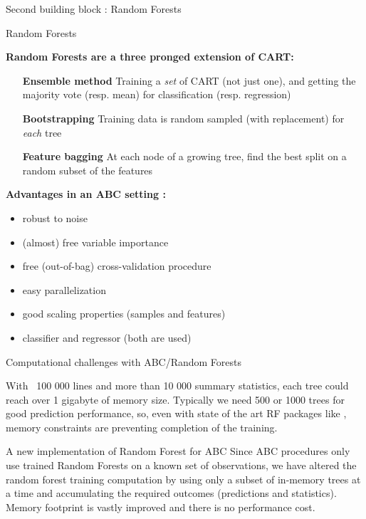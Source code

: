 \documentclass[final]{beamer}
\newlength{\colwidth}
\begin{document}
\begin{frame}[t]
\begin{columns}[t]
\begin{column}{\colwidth}
\begin{block}{Second building block : Random Forests}
\begin{block}{Random Forests}
      \begin{multicols}{2}
        \textbf{Random Forests \cite{breiman:2001} are a three pronged extension of CART:}
        \begin{itemize}
          \item[\textbf{Ensemble method}] Training a \emph{set} of CART (not just one), and getting the majority vote (resp. mean) for classification (resp. regression)
          \item[\textbf{Bootstrapping}] Training data is random sampled (with replacement) for \emph{each} tree
          \item[\textbf{Feature bagging}] At each node of a growing tree, find the best split on a random subset of the features 
        \end{itemize}
        \columnbreak
         \centering
        \textbf{Advantages in an ABC setting : }
        \justify
        \begin{itemize}
          \item robust to noise
          \item (almost) free variable importance
          \item free (out-of-bag) cross-validation procedure
          \item easy parallelization
          \item good scaling properties (samples and features)
          \item classifier and regressor (both are used)
        \end{itemize}  
          
      \end{multicols}


    \end{block}
  \end{block}

  \begin{alertblock}{Computational challenges with ABC/Random Forests}

    With ~100 000 lines and more than 10 000 summary statistics, each tree could reach over 1 gigabyte of memory size. Typically we need 500 or 1000 trees for good prediction performance, so, even with state of the art RF packages like \cite{wright2015ranger}, memory constraints are preventing completion of the training.
    
  \end{alertblock}
  \begin{block}{A new implementation of Random Forest for ABC}
    Since ABC procedures only use trained Random Forests on a known set of observations, we have altered the random forest training computation by using only a subset of in-memory trees at a time and accumulating the required outcomes (predictions and statistics). Memory footprint is vastly improved and there is no performance cost.


\end{block}
\end{column}
\end{columns}
\end{frame}
\end{document}
